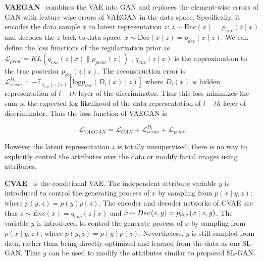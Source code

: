 \documentclass[10pt,letterpaper,twocolumn]{article}
\begin{document}
\vspace{0.07in}
\noindent \textbf{VAEGAN}~\cite{vaegan} combines the VAE into GAN and replaces
the element-wise errors of GAN with feature-wise errors of VAEGAN
in the data space. Specifically, it encodes the data sample $x$ to
latent representation $z$: $z\sim\mathrm{Enc}\left(x\right)=p_{enc}\left(z\mid x\right)$
and decodes the $z$ back to data space: $\tilde{x}\sim\mathrm{Dec}\left(x\mid z\right)=p_{dec}\left(x\mid z\right)$.
We can define the loss functions of the regularization prior as $\mathcal{L}_{prior}=KL\left(q_{enc}\left(z\mid x\right)\parallel p_{prior}\left(z\right)\right)$
, $q_{enc}\left(z\mid x\right)$ is the approximation to the true
posterior $p_{dec}\left(z\mid x\right)$. The reconstruction error
is $\mathcal{L}_{recon}^{D_{l}}=-\mathbb{E}_{q_{enc}\left(z\mid x\right)}\left[\mathrm{log}p_{dec}\left(D_{l}\left(x\right)\mid z\right)\right]$
where $D_{l}\left(x\right)$ is hidden representation of $l-th$ layer
of the discriminator. Thus this loss minimizes the sum of the expected
log likelihood of the data representation of $l-th$ layer of discriminator.
Thus the loss function of VAEGAN is

\noindent 
\begin{equation}
\mathcal{L}_{VAEGAN}=\mathcal{L}_{GAN}+\mathcal{L}_{recon}^{D_{l}}+\mathcal{L}_{prior}\label{eq:vaegan}
\end{equation}

\noindent However the latent representation $z$ is totally unsupervised;
there is no way to explicitly control the attributes over the data
or modify facial images using attributes.

\vspace{0.07in}

\noindent \textbf{CVAE}~\cite{yan2016eccv,cvae2016nips} is the conditional
VAE. The independent attribute variable $y$ is introduced to control
the generating process of $x$ by sampling from $p\left(x\mid y,z\right)$;
where $p\left(y,z\right)=p\left(y\right)p\left(z\right)$. The encoder
and decoder networks of CVAE are thus $z\sim Enc\left(x\right)=q_{enc}\left(z\mid x\right)$
and $\text{\ensuremath{\tilde{x}}}\sim Dec\left(z,y\right)=p_{dec}\left(x\mid z,y\right)$.
The variable $y$ is introduced to control the generate process of
$x$ by sampling from $p\left(x\mid y,z\right)$; where $p\left(y,z\right)=p\left(y\right)p\left(z\right)$.
Nevertheless, $y$ is still sampled from data, rather than being directly
optimized and learned from the data as our SL-GAN. Thus $y$ can be
used to modify the attributes similar to proposed SL-GAN.
\end{document}
